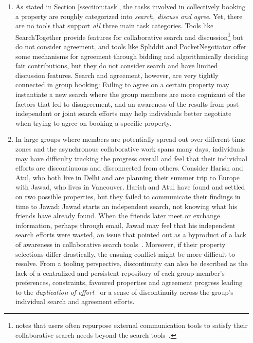 \begin{enumerate}[label={}, leftmargin=0cm, itemindent=0.2cm]

    \item \cDisconnectedTooling As stated in Section \ref{ssection:task}, the tasks involved in collectively booking a property are roughly categorized into \textit{search, discuss and agree}. Yet, there are no tools that support \textit{all} three main task categories. Tools like SearchTogether \cite{searchtogether} provide features for collaborative search and discussion\footnote{\citeauthor{collaborativesearchrevisted} notes that users often repurpose external communication tools to satisfy their collaborative search needs beyond the search tools~\cite{collaborativesearchrevisted}.} but do not consider agreement, and tools like Spliddit \cite{spliddit} and PocketNegotiator \cite{pocketnegotiator} offer some mechanisms for agreement through bidding and algorithmically deciding fair contributions, but they do not consider search and have limited discussion features. Search and agreement, however, are very tightly connected in group booking: Failing to agree on a certain property may instantiate a new search where the group members are more cognizant of the factors that led to disagreement, and an awareness of the results from past independent or joint search efforts may help individuals better negotiate when trying to agree on booking a specific property. 
    
    \item \cDiscontinuity In large groups where members are potentially spread out over different time zones and the asynchronous collaborative work spans many days, individuals may have difficulty tracking the progress overall and feel that their individual efforts are discontinuous and disconnected from others. Consider Harish and Atul, who both live in Delhi and are planning their summer trip to Europe with Jawad, who lives in Vancouver. Harish and Atul have found and settled on two possible properties, but they failed to communicate their findings in time to Jawad; Jawad starts an independent search, not knowing what his friends have already found. When the friends later meet or exchange information, perhaps through email, Jawad may feel that his independent search efforts were wasted, an issue that \citeauthor{searchtogether} pointed out as a byproduct of a lack of awareness in collaborative search tools~\cite{searchtogether}. Moreover, if their property selections differ drastically, the ensuing conflict might be more difficult to resolve. From a tooling perspective, discontinuity can also be described as the lack of a centralized and persistent repository of each group member's preferences, constraints, favoured properties and agreement progress leading to the \textit{duplication of effort}~\cite{searchtogether} or a sense of discontinuity across the group's individual search and agreement efforts.
    

\end{enumerate}
